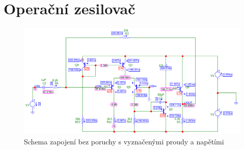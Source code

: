 \documentclass{article}
\begin{document}
% 

\section*{Operační zesilovač}

\begin{figure}[H]
  \begin{minipage}[t]{1.1\textwidth}
    \vspace{10mm}
    \hspace{-0.05\textwidth}
    \includegraphics[width=\textwidth]{sim/bezporuch/sch.png}
    \caption[obr]{Schema zapojení bez poruchy s vyznačenými proudy a napětími}
    \label{sch-bezPoruch}
  \end{minipage}
\end{figure}
\end{document}
